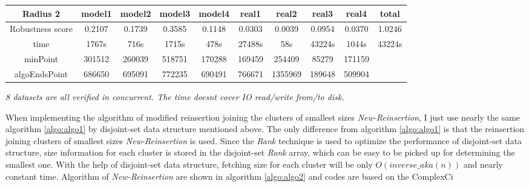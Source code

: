 \documentclass{article}
\begin{document}
\begin{table}[!htbp]
\begin{adjustwidth}{-1cm}{}
\begin{threeparttable}
\begin{tabular}{|c|c|c|c|c|c|c|c|c|c|}
				\textbf{Radius 2} & \textbf{model1} & \textbf{model2} & \textbf{model3} & \textbf{model4} & \textbf{real1} & \textbf{real2} & \textbf{real3} & \textbf{real4} & \textbf{total} \\ \hline
				Robustness score                 & 0.2107    & 0.1739    & 0.3585    & 0.1148    & 0.0303    & 0.0039    & 0.0954    & 0.0370    & 1.0246    \\ \hline
				
				time                             & 1767s     & 716s      & 1715s     & 478s      & 27488s    & 58s       & 43224s    & 1044s     & 43224s    \\ \hline
				
				minPoint                         & 301512          & 260039          & 518751          & 170288          & 169459         & 254409         & 85279          & 171159         &                \\ \hline
				algoEndsPoint                    & 686650          & 695091          & 772235          & 690491          & 766671         & 1355969        & 189648         & 509904         &                \\ \hline
				
			\end{tabular}
			\begin{tablenotes}
				\small
				\item\textit{ 8 datasets are all verified in concurrent. The time doesn\textquotesingle t cover IO read/write from/to disk.}
			\end{tablenotes}			
		\end{threeparttable}
	\end{adjustwidth}	
	\end{table}
	 
	 
	 When implementing the algorithm of modified reinsertion joining the clusters of smallest sizes \textit{New-Reinsertion}, I just use nearly the same algorithm \ref{algo:algo1} by disjoint-set data structure mentioned above. The only difference from algorithm \ref{algo:algo1} is that the reinsertion joining clusters of smallest sizes \textit{New-Reinsertion} is used. Since the \textit{Rank} technique is used to optimize the performance of disjoint-set data structure, size information for each cluster is stored in the disjoint-set \textit{Rank} array, which can be easy to be picked up for determining the smallest one. With the help of disjoint-set data structure, fetching size for each cluster will be only $O(inverse\_aka(n))$ and nearly constant time. Algorithm of \textit{New-Reinsertion} are shown in algorithm \ref{algo:algo2} and codes are based on the ComplexCi
	 
\end{document}
